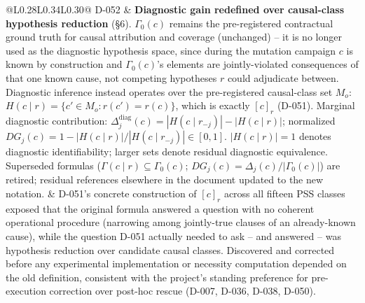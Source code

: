 \documentclass[11pt,a4paper]{article}
\begin{document}
\begin{longtable}{@{}L{0.28\textwidth}L{0.34\textwidth}L{0.30\textwidth}@{}}
D-052 & \textbf{Diagnostic gain redefined over causal-class hypothesis reduction} (\S6). $\Gamma_0(c)$ remains the pre-registered contractual ground truth for causal attribution and coverage (unchanged) -- it is no longer used as the diagnostic hypothesis space, since during the mutation campaign $c$ is known by construction and $\Gamma_0(c)$'s elements are jointly-violated consequences of that one known cause, not competing hypotheses $r$ could adjudicate between. Diagnostic inference instead operates over the pre-registered causal-class set $M_o$: $H(c\mid r) = \{c' \in M_o : r(c')=r(c)\}$, which is exactly $[c]_r$ (D-051). Marginal diagnostic contribution: $\Delta_j^{\text{diag}}(c) = |H(c\mid r_{-j})| - |H(c\mid r)|$; normalized $DG_j(c) = 1 - |H(c\mid r)|/|H(c\mid r_{-j})| \in [0,1]$. $|H(c\mid r)|=1$ denotes diagnostic identifiability; larger sets denote residual diagnostic equivalence. Superseded formulas ($\Gamma(c\mid r)\subseteq\Gamma_0(c)$; $DG_j(c)=\Delta_j(c)/|\Gamma_0(c)|$) are retired; residual references elsewhere in the document updated to the new notation. & D-051's concrete construction of $[c]_r$ across all fifteen PSS classes exposed that the original formula answered a question with no coherent operational procedure (narrowing among jointly-true clauses of an already-known cause), while the question D-051 actually needed to ask -- and answered -- was hypothesis reduction over candidate causal classes. Discovered and corrected before any experimental implementation or necessity computation depended on the old definition, consistent with the project's standing preference for pre-execution correction over post-hoc rescue (D-007, D-036, D-038, D-050).\\

\end{longtable}
\end{document}
